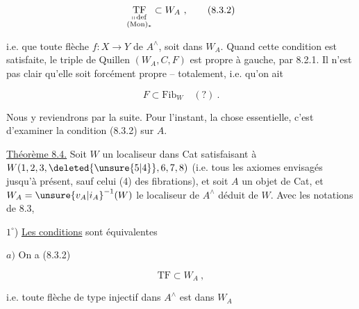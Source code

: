 \[
 \underset{\substack{\shortparallel\,\mathrm{def}\\(\mathrm{Mon})_\ast}}{\mathrm{TF}}\subset W_A\ ,
 \tag*{(8.3.2)}
\]

 i.e.  que toute flèche $f:X\to Y$ 
de $A^\wedge$,  soit dans $W_A$.
Quand cette condition est satisfaite, le triple de Quillen $(W_A,C,F)$ est propre à gauche, par 8.2.1.
Il n'est pas clair qu'elle soit forcément propre -- totalement, i.e. qu'on ait

\[
 F\subset\mathrm{Fib}_{W}\quad (?)\ .
 \tag*{(8.3.3)}
\]

Nous y reviendrons par la suite. Pour l'instant, la chose essentielle, c'est d'examiner la condition (8.3.2) sur $A$.

\uline{Théorème 8.4.} Soit $W$ un localiseur  dans Cat
satisfaisant à $W(1,2,3,\deleted{\unsure{5|4}},6,7,8)$  (i.e. tous les
axiomes envisagés jusqu'à présent, sauf  celui
(4) des fibrations),
et soit $A$ un objet de Cat, et $W_A=\unsure{v_A|i_A}^{-1}(W)$ le localiseur
de $A^\wedge$ déduit de $W$. Avec les notations de 8.3,


\textcircled{$1^\circ$}) \uline{Les conditions}  sont équivalentes

$a)$ On a (8.3.2)

\[
 \mathrm{TF}\subset W_A\ ,
\]

i.e. toute flèche de type injectif dans $A^\wedge$ est dans $W_A$

